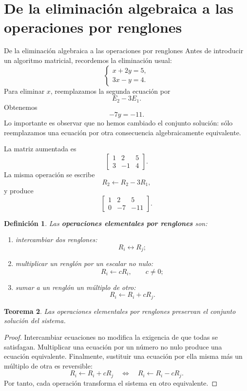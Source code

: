 \documentclass[aspectratio=169,9pt]{beamer}
\newtheorem{definicion}{Definición}[section]
\newtheorem{teorema}[definicion]{Teorema}
\theoremstyle{remark}
\begin{document}
\section{De la eliminación algebraica a las operaciones por renglones}
\begin{frame}[allowframebreaks,t]{De la eliminación algebraica a las operaciones por renglones}
Antes de introducir un algoritmo matricial, recordemos la eliminación usual:
\[
\begin{cases}
x+2y=5,\\
3x-y=4.
\end{cases}
\]
Para eliminar $x$, reemplazamos la segunda ecuación por
\[
E_2-3E_1.
\]
Obtenemos
\[
-7y=-11.
\]
Lo importante es observar que no hemos cambiado el conjunto solución: sólo reemplazamos una ecuación
por otra consecuencia algebraicamente equivalente.

La matriz aumentada es
\[
\left[
\begin{array}{cc|c}
1&2&5\\
3&-1&4
\end{array}
\right].
\]
La misma operación se escribe
\[
R_2\leftarrow R_2-3R_1,
\]
y produce
\[
\left[
\begin{array}{cc|c}
1&2&5\\
0&-7&-11
\end{array}
\right].
\]

\par{}\par\smallskip

\begin{definicion}
Las \textbf{operaciones elementales por renglones} son:
\begin{enumerate}
\item intercambiar dos renglones:
\[
R_i\leftrightarrow R_j;
\]
\item multiplicar un renglón por un escalar no nulo:
\[
R_i\leftarrow cR_i,\qquad c\neq0;
\]
\item sumar a un renglón un múltiplo de otro:
\[
R_i\leftarrow R_i+cR_j.
\]
\end{enumerate}
\end{definicion}

\begin{teorema}
Las operaciones elementales por renglones preservan el conjunto solución del sistema.
\end{teorema}

\begin{proof}
Intercambiar ecuaciones no modifica la exigencia de que todas se satisfagan. Multiplicar una ecuación
por un número no nulo produce una ecuación equivalente. Finalmente, sustituir una ecuación por ella
misma más un múltiplo de otra es reversible:
\[
R_i\leftarrow R_i+cR_j
\quad\Longleftrightarrow\quad
R_i\leftarrow R_i-cR_j.
\]
Por tanto, cada operación transforma el sistema en otro equivalente.
\end{proof}
\end{frame}
\end{document}
